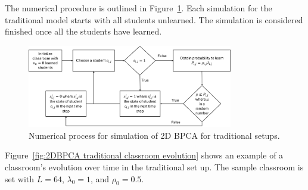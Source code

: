 The numerical procedure is outlined in Figure~\ref{fig:2DBPCA Traditional Flowchart}. Each simulation for the traditional model starts with all students unlearned. The simulation is considered finished once all the students have learned.

\begin{figure}[htbp!]
    \centering
    \includegraphics[width=0.8\textwidth]{figures/2DBPCA TI Flowchart.png}
    \caption[Traditional instruction simulation flowchart]{Numerical process for simulation of 2D BPCA for traditional setups.}
    \label{fig:2DBPCA Traditional Flowchart}
\end{figure}

Figure~\ref{fig:2DBPCA traditional classroom evolution} shows an example of a classroom's evolution over time in the traditional set up. The sample classroom is set with $L=64$, $\lambda_0 = 1$, and $\rho_0 = 0.5$.

